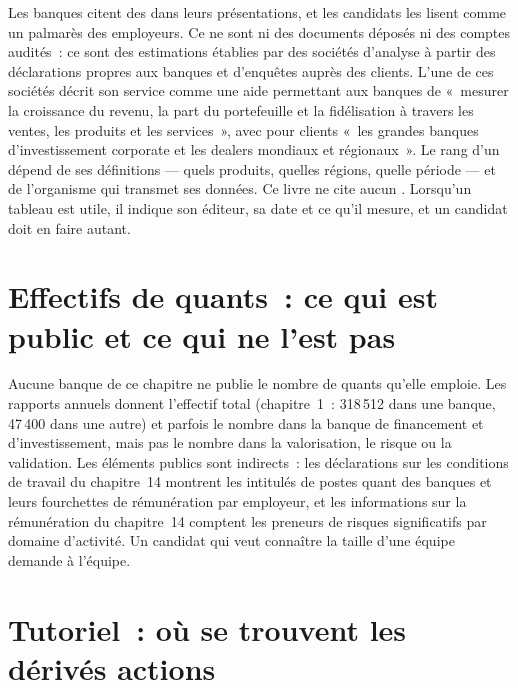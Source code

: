 Les banques citent des  dans leurs présentations, et les candidats les lisent comme un palmarès des employeurs. Ce ne sont ni des
documents déposés ni des comptes audités~: ce sont des estimations établies par des sociétés d'analyse à partir des déclarations propres aux banques et
d'enquêtes auprès des clients. L'une de ces sociétés décrit son service comme une aide permettant aux banques de «~mesurer la croissance du revenu, la part du portefeuille et la fidélisation
à travers les ventes, les produits et les services~», avec pour
clients «~les grandes banques d'investissement corporate et les dealers mondiaux et régionaux~». Le rang d'un  dépend de ses définitions --- quels produits, quelles régions, quelle période --- et de
l'organisme qui transmet ses données. Ce livre ne cite aucun . Lorsqu'un tableau est utile, il indique son éditeur, sa date
et ce qu'il mesure, et un candidat doit en faire autant.

\section{Effectifs de quants~: ce qui est public et ce qui ne l'est pas}

Aucune banque de ce chapitre ne publie le nombre de quants qu'elle emploie. Les rapports annuels donnent l'effectif total (chapitre~1~: 318\,512 dans une
banque, 47\,400 dans une autre) et parfois le nombre dans la banque de financement et d'investissement, mais pas le
nombre dans la valorisation, le risque ou la validation. Les éléments publics sont indirects~: les déclarations sur les conditions de travail du chapitre~14 montrent
les intitulés de postes quant des banques et leurs fourchettes de rémunération par employeur, et les informations sur la rémunération du chapitre~14 comptent
les preneurs de risques significatifs par domaine d'activité. Un candidat qui veut connaître la taille d'une équipe demande à l'équipe.

\section{Tutoriel~: où se trouvent les dérivés actions}\label{tut:in:bank-markets-divisions:tut}

